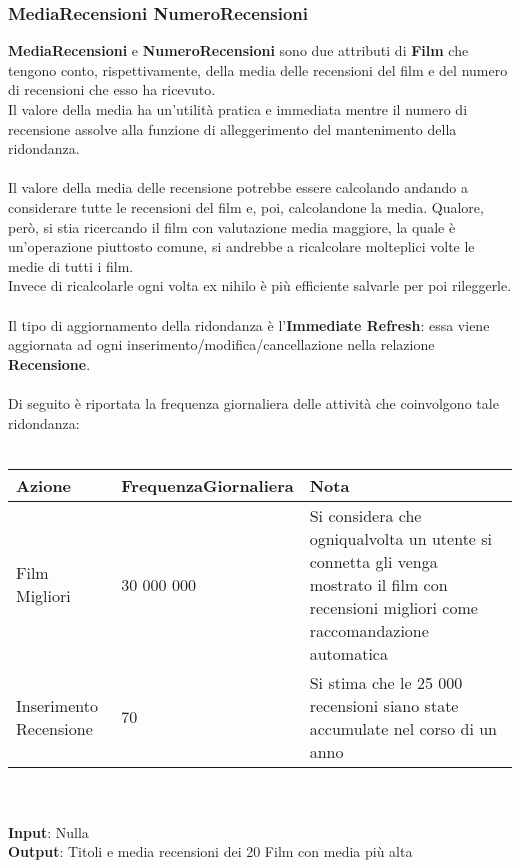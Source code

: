 \documentclass{article}
\begin{document}
\subsubsection{MediaRecensioni NumeroRecensioni}
\textbf{MediaRecensioni} e \textbf{NumeroRecensioni} sono due attributi di \textbf{Film} che tengono conto, rispettivamente, della media delle recensioni del film e del numero di recensioni che esso ha ricevuto. \\
Il valore della media ha un'utilità pratica e immediata mentre il numero di recensione assolve alla funzione di alleggerimento del mantenimento della ridondanza. \\ \\ 
Il valore della media delle recensione potrebbe essere calcolando andando a considerare tutte le recensioni del film e, poi, calcolandone la media. Qualore, però, si stia ricercando il film con valutazione media maggiore, la quale è un'operazione piuttosto comune, si andrebbe a ricalcolare molteplici volte le medie di tutti i film. \\
Invece di ricalcolarle ogni volta ex nihilo è più efficiente salvarle per poi rileggerle. 
\\ \\ 
Il tipo di aggiornamento della ridondanza è l'\textbf{Immediate Refresh}: essa viene aggiornata ad ogni inserimento/modifica/cancellazione nella relazione \textbf{Recensione}.
\\ \\
Di seguito è riportata la frequenza giornaliera delle attività che coinvolgono tale ridondanza: \\ \\
\begin{tabular}{|C{2.2cm}|C{3.8cm}|C{4.4cm}|}
\hline
    \textbf{Azione} & \textbf{FrequenzaGiornaliera} & \textbf{Nota} \\
\hline
Film Migliori & 30 000 000 & Si considera che ogniqualvolta un utente si connetta gli venga mostrato il film con recensioni migliori come raccomandazione automatica \\
\hline
Inserimento Recensione & 70 & Si stima che le 25 000 recensioni siano state accumulate nel corso di un anno \\
\hline
\end{tabular}
\\ \\ 
\textbf{Input}: Nulla \\
\textbf{Output}: Titoli e media recensioni dei 20 Film con media più alta
\\ \\
\end{document}
